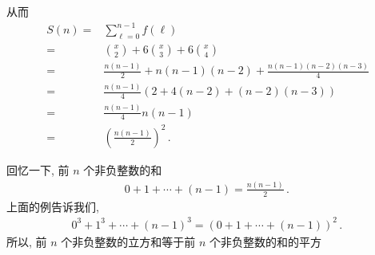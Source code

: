 \begin{example}
    从而
    \begin{align*}
        S(n)
        = {} & \sum_{\ell = 0}^{n - 1} f(\ell)                             \\
        = {} & \binom{x}{2} + 6 \binom{x}{3} + 6 \binom{x}{4}              \\
        = {} & \frac{n(n-1)}{2} + n(n-1)(n-2) + \frac{n(n-1)(n-2)(n-3)}{4} \\
        = {} & \frac{n(n-1)}{4} (2 + 4(n-2) + (n-2)(n-3))                  \\
        = {} & \frac{n(n-1)}{4} n(n-1)                                     \\
        = {} & \left( \frac{n(n-1)}{2} \right)^2 \period
    \end{align*}
\end{example}

\begin{remark}
    回忆一下, 前 $n$ 个非负整数的和
    \begin{align*}
        0 + 1 + \cdots + (n - 1) = \frac{n(n-1)}{2} \period
    \end{align*}
    上面的例告诉我们,
    \begin{align*}
        0^3 + 1^3 + \cdots + (n - 1)^3 = (0 + 1 + \cdots + (n - 1))^2 \period
    \end{align*}
    所以, 前 $n$ 个非负整数的立方和等于前 $n$ 个非负整数的和的平方\period
\end{remark}


